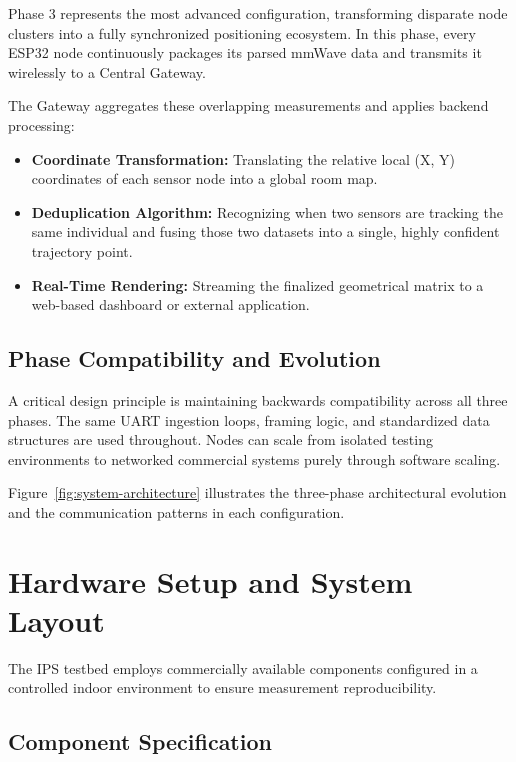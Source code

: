 Phase 3 represents the most advanced configuration, transforming disparate node clusters into a fully synchronized positioning ecosystem. In this phase, every ESP32 node continuously packages its parsed mmWave data and transmits it wirelessly to a Central Gateway.

The Gateway aggregates these overlapping measurements and applies backend processing:
\begin{itemize}
    \item \textbf{Coordinate Transformation:} Translating the relative local (X, Y) coordinates of each sensor node into a global room map.
    \item \textbf{Deduplication Algorithm:} Recognizing when two sensors are tracking the same individual and fusing those two datasets into a single, highly confident trajectory point.
    \item \textbf{Real-Time Rendering:} Streaming the finalized geometrical matrix to a web-based dashboard or external application.
\end{itemize}

\subsection{Phase Compatibility and Evolution}
\label{subsec:phase-compatibility}

A critical design principle is maintaining backwards compatibility across all three phases. The same UART ingestion loops, framing logic, and standardized data structures are used throughout. Nodes can scale from isolated testing environments to networked commercial systems purely through software scaling.

Figure~\ref{fig:system-architecture} illustrates the three-phase architectural evolution and the communication patterns in each configuration.

\section{Hardware Setup and System Layout}
\label{sec:hardware-setup}

The IPS testbed employs commercially available components configured in a controlled indoor environment to ensure measurement reproducibility.

\subsection{Component Specification}
\label{subsec:components}

